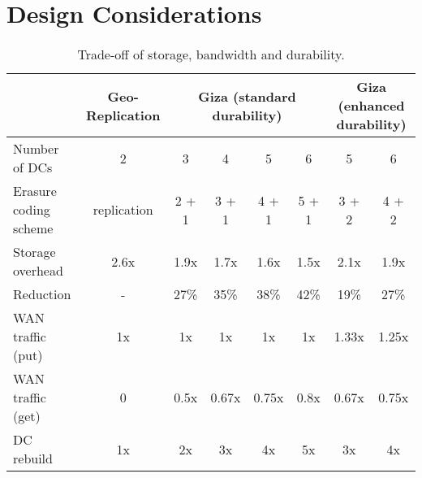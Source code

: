 \section{Design Considerations}
\label{sec:motivation}

%
%


\begin{table*}[tp]
\centering
\begin{tabular}{|l||c||c|c|c|c||c|c|}
\hline
				& Geo-Replication    	& \multicolumn{4}{c||}{Giza (standard durability)}		& \multicolumn{2}{c|}{Giza (enhanced durability)}
\\ \hline \hline
Number of DCs 				& 2										& 3 & 4 & 5 & 6									& 5 & 6
\\ \hline
Erasure coding scheme & replication					& 2 + 1 & 3 + 1 & 4 + 1 & 5 + 1	& 3 + 2 & 4 + 2
\\ \hline \hline
Storage overhead			& 2.6x								& 1.9x & 1.7x & 1.6x & 1.5x			& 2.1x & 1.9x
\\ \hline
Reduction							& -										& 27\% & 35\% & 38\% & 42\%			& 19\% & 27\%
\\ \hline \hline
WAN traffic (put)			& 1x									& 1x & 1x & 1x & 1x 						& 1.33x & 1.25x
\\ \hline
WAN traffic (get)			& 0										& 0.5x & 0.67x & 0.75x & 0.8x		& 0.67x & 0.75x
\\ \hline
DC rebuild 						& 1x									& 2x & 3x & 4x & 5x 						& 3x & 4x
\\ \hline \hline
\end{tabular}
\caption{Trade-off of storage, bandwidth and durability.}
\label{tab:cost_benefit}
\end{table*}


